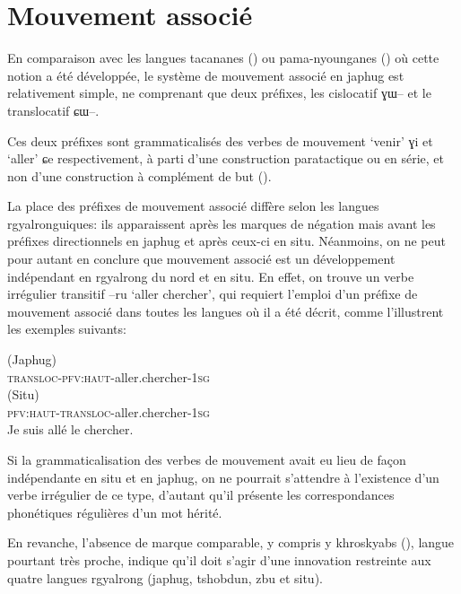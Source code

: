 \documentclass[oldfontcommands,oneside,a4paper,11pt]{article}
\newcommand{\ipa}[1]{{\phon \mbox{#1}}} %
\begin{document}
\section{Mouvement associé} 
En comparaison avec les langues tacananes (\citealt{guillaume09mouv.assoc}) ou pama-nyounganes (\citealt{koch84associated.motion}) où cette notion a été développée, le système de mouvement associé en japhug est relativement simple, ne comprenant que deux préfixes, les cislocatif \ipa{ɣɯ--} et le translocatif \ipa{ɕɯ--}.

Ces deux préfixes sont grammaticalisés des verbes de mouvement `venir' \ipa{ɣi} et `aller' \ipa{ɕe} respectivement, à parti d'une construction paratactique ou en série, et non d'une construction à complément de but (\citealt{jacques13harmonization}).

La place des préfixes de mouvement associé diffère selon les langues rgyalronguiques: ils apparaissent après les marques de négation mais avant les préfixes directionnels en japhug et après ceux-ci en situ. Néanmoins, on ne peut pour autant en conclure que  mouvement associé est un développement indépendant en rgyalrong du nord et en situ. En effet, on trouve un verbe irrégulier transitif \ipa{--ru} `aller chercher', qui requiert l'emploi d'un préfixe de mouvement associé dans toutes les langues où il a été décrit, comme l'illustrent les exemples suivants:

\begin{exe}
 \ex  
 \gll  \ipa{\textbf{ɕ}-tɤ-ru-t-a}  (Japhug) \\
 \textsc{transloc-pfv:haut}-aller.chercher-\textsc{1sg} \\
\ex  
 \gll  \ipa{rə-\textbf{ɕɐ}-rô-ŋ}  (Situ) \\
 \textsc{pfv:haut-transloc}-aller.chercher-\textsc{1sg} \\
\glt Je suis allé le chercher.
\end{exe}
 Si la grammaticalisation des verbes de mouvement avait eu lieu de façon indépendante en situ et en japhug, on ne pourrait s'attendre à l'existence d'un verbe irrégulier de ce type, d'autant qu'il présente les correspondances phonétiques régulières d'un mot hérité.

En revanche, l'absence de marque comparable, y compris y khroskyabs (\citealt{lai13affixale}), langue pourtant très proche, indique qu'il doit s'agir d'une innovation restreinte aux quatre langues rgyalrong (japhug, tshobdun, zbu et situ).
\end{document}
